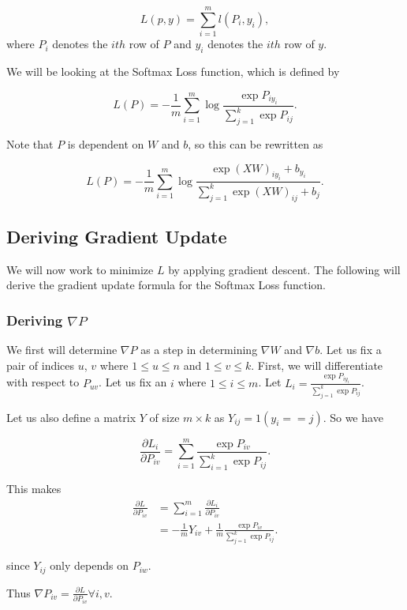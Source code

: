 \[
L(p, y) = \sum_{i=1}^m l(P_i, y_i),
\]
where $P_i$ denotes the $ith$ row of $P$ and $y_i$ denotes the $ith$ row of $y$.

We will be looking at the Softmax Loss function, which is defined by

\[
L(P) = -\frac{1}{m} \sum_{i=1}^m \log \frac{\exp{P_{iy_i}}}
                                           {\sum_{j=1}^k \exp{P_{ij}}}.
\]

Note that $P$ is dependent on $W$ and $b$, so this can be rewritten as

\[
L(P) = -\frac{1}{m} \sum_{i=1}^m \log
        \frac{\exp{\left(XW\right)_{iy_i} + b_{y_i}}}
             {\sum_{j=1}^k \exp{\left(XW\right)_{ij} + b_j}}.
\]

\subsection{Deriving Gradient Update}
We will now work to minimize $L$ by applying gradient descent. The following
will derive the gradient update formula for the Softmax Loss function.

\subsubsection{Deriving $\nabla P$}
We first will determine $\nabla P$ as a step in determining $\nabla W$ and
$\nabla b$. Let us fix a pair of indices $u$, $v$ where $1 \leq u \leq n$ and
$1 \leq v \leq k$. First, we will differentiate with respect to $P_{uv}$.
Let us fix an $i$ where $1 \leq i \leq m$.  Let $L_i = \frac{\exp{P_{iy_i}}}
{\sum_{j=1}^k \exp{P_{ij}}}$.


Let us also define a matrix $Y$ of size $m \times k$ as $Y_{ij} = 1(y_i ==
j)$. So we have 

$$\frac{\partial L_i}{\partial P_{iv}} = \sum_{i=1}^m
\frac{\exp{P_{iv}}}{\sum_{i=1}^k \exp{P_{ij}}}.$$

This makes
\begin{align*}
  \frac{\partial L}{\partial P_{iv}}
  &= \sum_{i=1}^m \frac{\partial L_i}{\partial P_{iv}}\\
  &= -\frac{1}{m} Y_{iv} + \frac{1}{m}
  \frac{\exp{P_{iv}}}{\sum_{j=1}^k \exp{P_{ij}}}.
\end{align*}
  
since $Y_{ij}$ only depends on $P_{iw}$.

Thus $\nabla P_{iv} = \frac{\partial L}{\partial P_{iv}} \forall i,v.$

